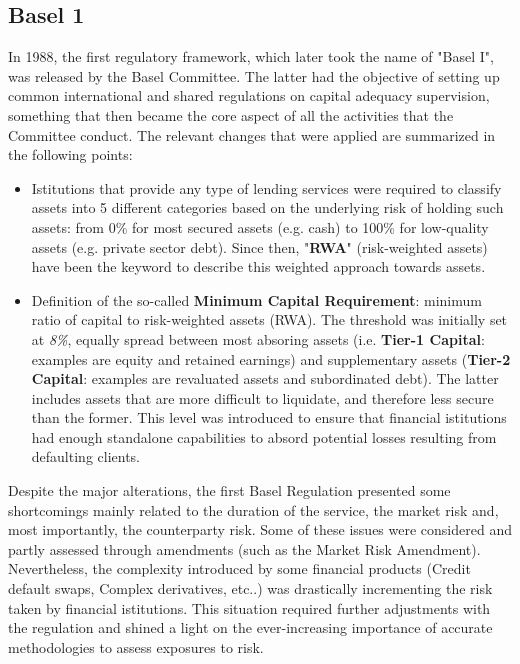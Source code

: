 \documentclass[a4paper,12pt]{article}
\begin{document}
    \subsection[]{Basel 1}
    In 1988, the first regulatory framework, which later took the name of "Basel I", was released by the Basel Committee. 
    The latter had the objective of setting up common international and shared regulations on capital adequacy supervision, something that then became the core aspect of all the activities that the Committee conduct. 
    The relevant changes that were applied are summarized in the following points:
    
        \begin{itemize}
            \item Istitutions that provide any type of lending services were required to classify assets into 5 different categories based on the underlying risk of holding such assets: from 0\% for most secured assets (e.g. cash) to 100\% for low-quality assets (e.g. private sector debt). Since then, "\textbf{RWA}" (risk-weighted assets) have been the keyword to describe this weighted approach towards assets.
            \item Definition of the so-called \textbf{Minimum Capital Requirement}: minimum ratio of capital to risk-weighted assets (RWA). The threshold was initially set at \textit{8\%}, equally spread between most absoring assets (i.e. \textbf{Tier-1 Capital}: examples are equity and retained earnings) and supplementary assets (\textbf{Tier-2 Capital}: examples are revaluated assets and subordinated debt). The latter includes assets that are more difficult to liquidate, and therefore less secure than the former. This level was introduced to ensure that financial istitutions had enough standalone capabilities to absord potential losses resulting from defaulting clients.
        \end{itemize}

    Despite the major alterations, the first Basel Regulation presented some shortcomings mainly related to the duration of the service, the market risk and, most importantly, the counterparty risk. Some of these issues were
    considered and partly assessed through amendments (such as the Market Risk Amendment). Nevertheless, the complexity introduced by some financial products (Credit default swaps, Complex derivatives, etc..) was drastically incrementing the risk taken by financial istitutions. 
    This situation required further adjustments with the regulation and shined a light on the ever-increasing importance of accurate methodologies to assess exposures to risk. 
     
\end{document}
